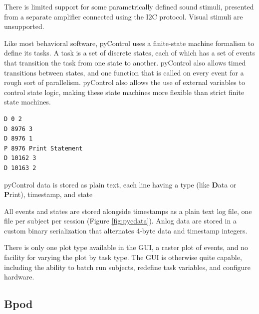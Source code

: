 There is limited support for some parametrically defined sound stimuli, presented from a separate amplifier connected using the I2C protocol. Visual stimuli are unsupported.

Like most behavioral software, pyControl uses a finite-state machine formalism to define its tasks. A task is a set of discrete states, each of which has a set of events that transition the task from one state to another. pyControl also allows timed transitions between states, and one function that is called on every event for a rough sort of parallelism. pyControl also allows the use of external variables to control state logic, making these state machines more flexible than strict finite state machines.

\begin{marginfigure}[-3.5cm]
\begin{verbatim}
D 0 2
D 8976 3
D 8976 1
P 8976 Print Statement
D 10162 3
D 10163 2
\end{verbatim}
\caption{pyControl data is stored as plain text, each line having a type (like \textbf{D}ata or \textbf{P}rint), timestamp, and state}
\label{fig:pycdata}
\end{marginfigure}

All events and states are stored alongside timestamps as a plain text log file, one file per subject per session (Figure \ref{fig:pycdata}). Anlog data are stored in a custom binary serialization that alternates 4-byte data and timestamp integers.

There is only one plot type available in the GUI, a raster plot of events, and no facility for varying the plot by task type. The GUI is otherwise quite capable, including the ability to batch run subjects, redefine task variables, and configure hardware.\\

\subsection{Bpod}

